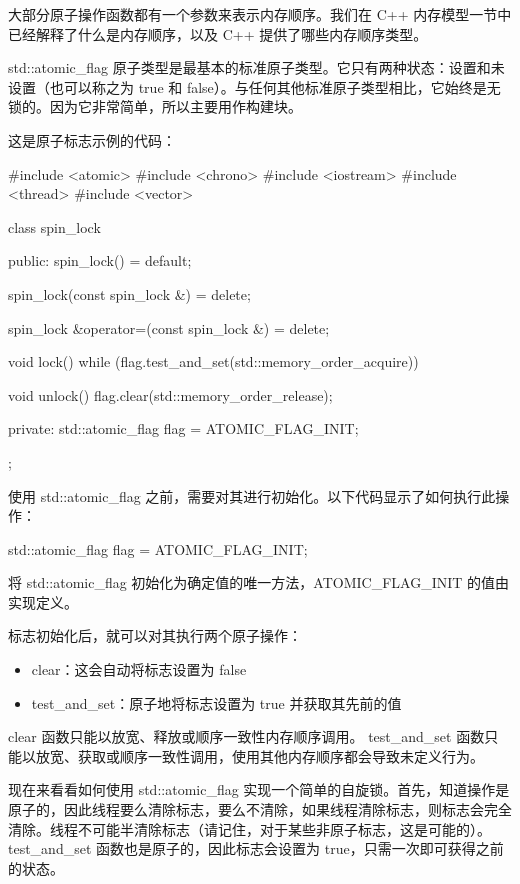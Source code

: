 大部分原子操作函数都有一个参数来表示内存顺序。我们在 C++ 内存模型一节中已经解释了什么是内存顺序，以及 C++ 提供了哪些内存顺序类型。


std::atomic\_flag 原子类型是最基本的标准原子类型。它只有两种状态：设置和未设置（也可以称之为 true 和 false）。与任何其他标准原子类型相比，它始终是无锁的。因为它非常简单，所以主要用作构建块。

这是原子标志示例的代码：

\begin{cpp}
#include <atomic>
#include <chrono>
#include <iostream>
#include <thread>
#include <vector>

class spin_lock {
    public:
    spin_lock() = default;

    spin_lock(const spin_lock &) = delete;

    spin_lock &operator=(const spin_lock &) = delete;

    void lock() {
        while (flag.test_and_set(std::memory_order_acquire)) {
        }
    }

    void unlock() {
        flag.clear(std::memory_order_release);
    }

private:
    std::atomic_flag flag = ATOMIC_FLAG_INIT;
};
\end{cpp}

使用 std::atomic\_flag 之前，需要对其进行初始化。以下代码显示了如何执行此操作：

\begin{cpp}
std::atomic_flag flag = ATOMIC_FLAG_INIT;
\end{cpp}

将 std::atomic\_flag 初始化为确定值的唯一方法，ATOMIC\_FLAG\_INIT 的值由实现定义。

标志初始化后，就可以对其执行两个原子操作：

\begin{itemize}
\item
clear：这会自动将标志设置为 false

\item
test\_and\_set：原子地将标志设置为 true 并获取其先前的值
\end{itemize}

clear 函数只能以放宽、释放或顺序一致性内存顺序调用。 test\_and\_set 函数只能以放宽、获取或顺序一致性调用，使用其他内存顺序都会导致未定义行为。

现在来看看如何使用 std::atomic\_flag 实现一个简单的自旋锁。首先，知道操作是原子的，因此线程要么清除标志，要么不清除，如果线程清除标志，则标志会完全清除。线程不可能半清除标志（请记住，对于某些非原子标志，这是可能的）。 test\_and\_set 函数也是原子的，因此标志会设置为 true，只需一次即可获得之前的状态。

